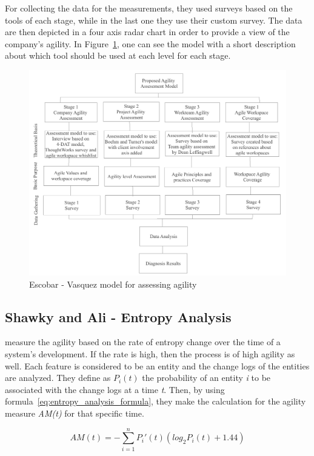 For collecting the data for the measurements, they used surveys based on the tools of each stage, while in the last one they use their custom survey. The data are then depicted in a four axis radar chart in order to provide a view of the company's agility. In Figure~\ref{escobar_model}, one can see the model with a short description about which tool should be used at each level for each stage.

\begin{figure} [H]
\centerline{\includegraphics[scale=0.75]{include/relatedwork/fig/escobar_model.pdf}}
\caption{Escobar - Vasquez model for assessing agility} 
\label{escobar_model}
\end{figure}

\subsection{Shawky and Ali - Entropy Analysis}
\citet{entropy} measure the agility based on the rate of entropy change over the time of a system's development. If the rate is high, then the process is of high agility as well. Each feature is considered to be an entity and the change logs of the entities are analyzed. They define as $P_i(t)$  the probability of an entity \textit{i} to be associated with the change logs at a time \textit{t}. Then, by using formula~\eqref{eq:entropy_analysis_formula}, they make the calculation for the agility measure \textit{AM(t)} for that specific time.

\begin{equation} \label{eq:entropy_analysis_formula} AM(t) = - \sum_{i=1}^{n} P_i'(t) (log_2 P_i(t) + 1.44) \end{equation} 

